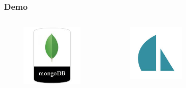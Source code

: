 \documentclass{beamer}
\begin{document}
\begin{frame}
\frametitle{Demo}
\begin{columns}[c]
\begin{figure}
\includegraphics[width=0.8\linewidth]{mongo4.png}
\end{figure}
\begin{figure}
\includegraphics[width=0.8\linewidth]{sails.png}
\end{figure}
\begin{figure}

\end{figure}
\end{columns}
\end{frame}
\end{document}

